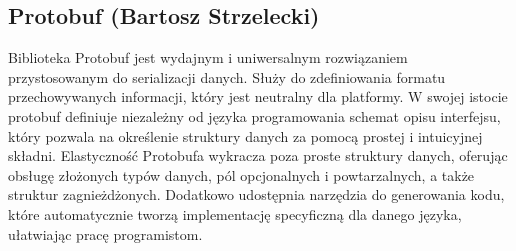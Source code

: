 \subsection{Protobuf (Bartosz Strzelecki)}

Biblioteka Protobuf jest wydajnym i uniwersalnym rozwiązaniem przystosowanym do serializacji
danych. Służy do zdefiniowania formatu przechowywanych informacji, który jest neutralny dla platformy.
W swojej istocie protobuf definiuje niezależny od języka programowania schemat opisu interfejsu,
który pozwala na określenie struktury danych za pomocą prostej i intuicyjnej składni.
Elastyczność Protobufa wykracza poza proste struktury danych, oferując obsługę złożonych typów danych, pól opcjonalnych i powtarzalnych,
a także struktur zagnieżdżonych. Dodatkowo udostępnia narzędzia do generowania kodu,
które automatycznie tworzą implementację specyficzną dla danego języka, ułatwiając pracę programistom.
